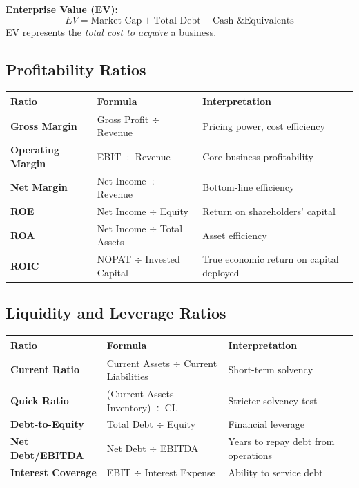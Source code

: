 \begin{formulabox}
\textbf{Enterprise Value (EV):}
\[
  EV = \text{Market Cap} + \text{Total Debt} - \text{Cash \& Equivalents}
\]
EV represents the \emph{total cost to acquire} a business.
\end{formulabox}

\subsection{Profitability Ratios}

\begin{center}
\begin{tabular}{>{\bfseries}p{3.5cm} p{5.5cm} p{4.5cm}}
\toprule
Ratio & Formula & Interpretation \\
\midrule
Gross Margin & Gross Profit $\div$ Revenue & Pricing power, cost efficiency \\
Operating Margin & EBIT $\div$ Revenue & Core business profitability \\
Net Margin & Net Income $\div$ Revenue & Bottom-line efficiency \\
ROE & Net Income $\div$ Equity & Return on shareholders' capital \\
ROA & Net Income $\div$ Total Assets & Asset efficiency \\
ROIC & NOPAT $\div$ Invested Capital & True economic return on capital deployed \\
\bottomrule
\end{tabular}
\end{center}

\subsection{Liquidity and Leverage Ratios}

\begin{center}
\begin{tabular}{>{\bfseries}p{3.5cm} p{5.5cm} p{4.5cm}}
\toprule
Ratio & Formula & Interpretation \\
\midrule
Current Ratio & Current Assets $\div$ Current Liabilities & Short-term solvency \\
Quick Ratio & (Current Assets $-$ Inventory) $\div$ CL & Stricter solvency test \\
Debt-to-Equity & Total Debt $\div$ Equity & Financial leverage \\
Net Debt/EBITDA & Net Debt $\div$ EBITDA & Years to repay debt from operations \\
Interest Coverage & EBIT $\div$ Interest Expense & Ability to service debt \\
\bottomrule
\end{tabular}
\end{center}

